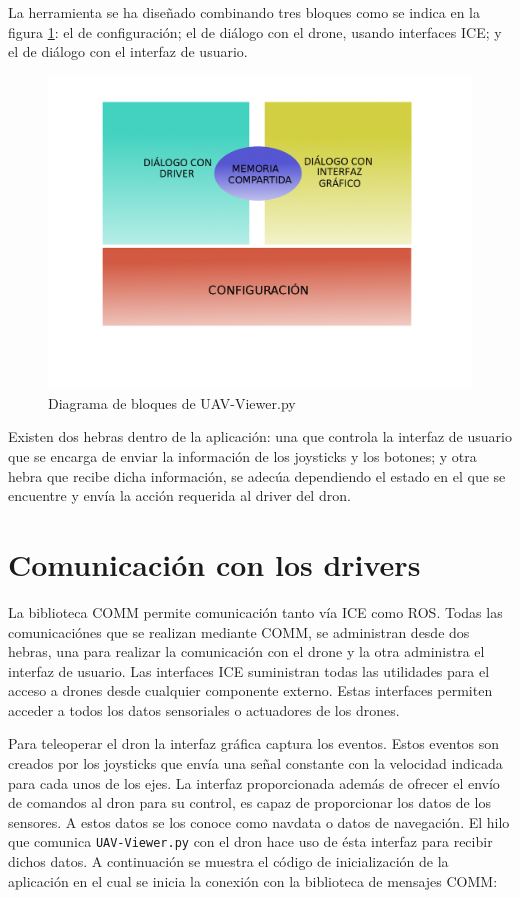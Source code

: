 La herramienta se ha diseñado combinando tres bloques como se indica en la figura \ref{fig:memoriaUav}: el de configuración; el de diálogo con el drone, usando interfaces ICE; y el de diálogo con el interfaz de usuario.

\begin{figure}[H]
  \centering
  \includegraphics[scale=0.3]{imagenes/MemoriaCompartidaUAV.png}
  \caption{Diagrama de bloques de UAV-Viewer.py}
  \label{fig:memoriaUav}
\end{figure}

Existen dos hebras dentro de la aplicación: una que controla la interfaz de usuario que se encarga de enviar la información de los joysticks y los botones; y otra hebra que recibe dicha información, se adecúa dependiendo el estado en el que se encuentre y envía la acción requerida al driver del dron.


\section{Comunicación con los drivers} 


La biblioteca COMM permite comunicación tanto vía ICE como ROS. Todas las comunicaciónes que se realizan mediante COMM, se administran desde dos hebras, una para realizar la comunicación con el drone y la otra administra el interfaz de usuario. Las interfaces ICE suministran todas las utilidades para el acceso a drones desde cualquier componente externo. Estas interfaces permiten acceder a todos los datos sensoriales o actuadores de los drones.

Para teleoperar el dron la interfaz gráfica captura los eventos. Estos eventos son creados por los joysticks que envía una señal constante con la velocidad indicada para cada unos de los ejes. La interfaz proporcionada además de ofrecer el envío de comandos al dron para su control, es capaz de proporcionar los datos de los sensores. A estos datos se los conoce como navdata o datos de navegación. El hilo que comunica \texttt{UAV-Viewer.py} con el dron hace uso de ésta interfaz para recibir dichos datos. A continuación se muestra el código de inicialización de la aplicación en el cual se inicia la conexión con la biblioteca de mensajes COMM:

